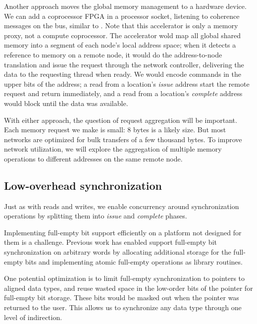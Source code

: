 \documentclass[10pt,nocopyrightspace,preprint]{sigplanconf}
\begin{document}
Another approach moves the global memory management to a hardware
device. We can add a coprocessor FPGA in a processor socket, listening
to coherence messages on the bus, similar to \cite{mogill}. Note that
this accelerator is only a memory proxy, not a compute
coprocessor. The accelerator wold map all global shared memory into a
segment of each node's local address space; when it detects a
reference to memory on a remote node, it would do the address-to-node
translation and issue the request through the network controller,
delivering the data to the requesting thread when ready. We would
encode commands in the upper bits of the address; a read from a
location's {\em issue} address start the remote request and return
immediately, and a read from a location's {\em complete} address would
block until the data was available.



With either approach, the question of request aggregation will be
important. Each memory request we make is small: 8 bytes is a likely
size. But most networks are optimized for bulk transfers of a few
thousand bytes. To improve network utilization, we will explore the
aggregation of multiple memory operations to different addresses on
the same remote node. 


\subsection{Low-overhead synchronization}

Just as with reads and writes, we enable concurrency around
synchronization operations by splitting them into {\em issue} and {\em
  complete} phases.

Implementing full-empty bit support efficiently on a platform not
designed for them is a challenge. Previous work \cite{qthreads} has
enabled support full-empty bit synchronization on arbitrary words by
allocating additional storage for the full-empty bits and implementing
atomic full-empty operations as library routines.

One potential optimization is to limit full-empty synchronization to
pointers to aligned data types, and reuse wasted space in the
low-order bits of the pointer for full-empty bit storage. These bits
would be masked out when the pointer was returned to the user.  This
allows us to synchronize any data type through one level of
indirection.
\end{document}
